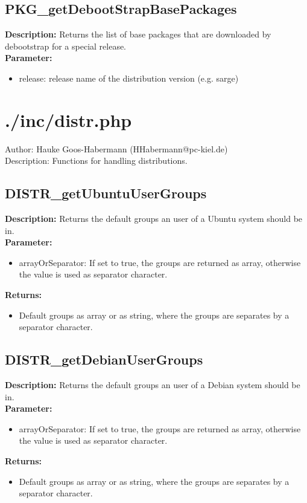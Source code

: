 \subsection{PKG\_getDebootStrapBasePackages}
\textbf{Description:} Returns the list of base packages that are downloaded by debootstrap for a special release.\\
\textbf{Parameter:}
\begin{itemize}
\item release: release name of the distribution version (e.g. sarge)
\end{itemize}

\newpage\section{./inc/distr.php}
 Author: Hauke Goos-Habermann (HHabermann@pc-kiel.de)\\
 Description: Functions for handling distributions.\\

\subsection{DISTR\_getUbuntuUserGroups}
\textbf{Description:} Returns the default groups an user of a Ubuntu system should be in.\\
\textbf{Parameter:}
\begin{itemize}
\item arrayOrSeparator: If set to true, the groups are returned as array, otherwise the value is used as separator character.
\end{itemize}
\textbf{Returns:}
\begin{itemize}
\item Default groups as array or as string, where the groups are separates by a separator character.
\end{itemize}

\subsection{DISTR\_getDebianUserGroups}
\textbf{Description:} Returns the default groups an user of a Debian system should be in.\\
\textbf{Parameter:}
\begin{itemize}
\item arrayOrSeparator: If set to true, the groups are returned as array, otherwise the value is used as separator character.
\end{itemize}
\textbf{Returns:}
\begin{itemize}
\item Default groups as array or as string, where the groups are separates by a separator character.
\end{itemize}

